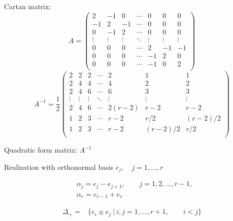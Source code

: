 \documentclass[12pt]{article}
\begin{document}
Cartan matrix:
\[
A=\left(
\begin{array}{ccccccc}
 2 & -1& 0 &\cdots & 0 & 0  &0 \\
 -1& 2 & -1 &\cdots & 0 & 0 &0 \\
 0 & -1 & 2 &\cdots & 0 & 0 &0 \\
  \vdots&\vdots &\vdots &\ddots &\vdots &\vdots&\vdots \\
 0&0 &0 &\cdots & 2& -1 & -1\\
 0&0 &0 &\cdots & -1& 2 &  0 \\
 0&0 &0 &\cdots & -1 & 0 & 2\\
\end{array}
\right)\]
\[
A^{-1}=\frac{1}{2}
\left(
\begin{array}{ccccccc}
 2& 2& 2 &\cdots & 2 & 1 & 1 \\
 2& 4 & 4 &\cdots & 4 & 2 & 2 \\
 2& 4 & 6 &\cdots & 6 & 3 & 3 \\
  \vdots&\vdots &\vdots &\ddots &\vdots &\vdots &\vdots \\
 2&4 &6 &\cdots & 2(r-2)& r-2 & r-2\\
 1&2 &3 &\cdots & r-2  & r/2 & (r-2)/2\\
 1&2 &3 &\cdots & r-2  & (r-2)/2 & r/2\\
\end{array}
\right)
\]

Quadratic form matrix: $A^{-1}$

Realization with orthonormal basis $e_j,\quad j=1,\dots,r$

\begin{align*}
  &\alpha_{j}=e_j-e_{j+1},\qquad j=1,2,\dots,r-1,\\
  &\alpha_{r}=e_{r-1}+e_{r}
\end{align*}

\begin{align*}
 \Delta_{+}=&\{e_i \pm e_j\ |\ i,j=1,\dots,r+1,\qquad i<j\}
\end{align*}
\newpage
%
\end{document}
